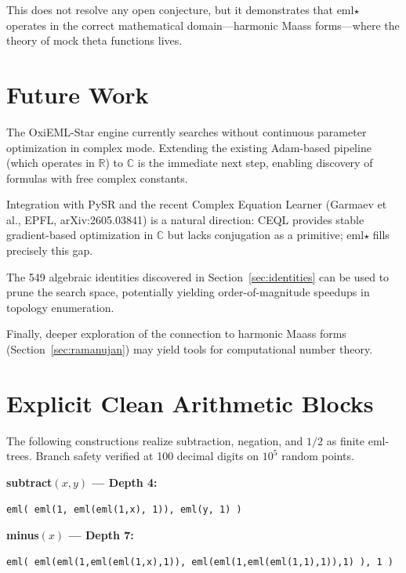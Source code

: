 \documentclass[11pt,a4paper]{article}
\begin{document}
This does not resolve any open conjecture, but it demonstrates that eml$\star$
operates in the correct mathematical domain---harmonic Maass forms---where
the theory of mock theta functions lives.


\section{Future Work}

The OxiEML-Star engine currently searches without continuous parameter
optimization in complex mode.  Extending the existing Adam-based pipeline
(which operates in $\mathbb{R}$) to $\mathbb{C}$ is the immediate next step,
enabling discovery of formulas with free complex constants.

Integration with PySR and the recent Complex Equation Learner
(Garmaev et al., EPFL, arXiv:2605.03841) is a natural direction:
CEQL provides stable gradient-based optimization in $\mathbb{C}$ but lacks
conjugation as a primitive; eml$\star$ fills precisely this gap.

The 549 algebraic identities discovered in Section~\ref{sec:identities}
can be used to prune the search space, potentially yielding order-of-magnitude
speedups in topology enumeration.

Finally, deeper exploration of the connection to harmonic Maass forms
(Section~\ref{sec:ramanujan}) may yield tools for computational number theory.

\appendix
\section{Explicit Clean Arithmetic Blocks}

The following constructions realize subtraction, negation, and $1/2$ as finite eml-trees. Branch safety verified at 100 decimal digits on $10^5$ random points.

\textbf{subtract$(x, y)$ --- Depth 4:}
\begin{verbatim}
eml( eml(1, eml(eml(1,x), 1)), eml(y, 1) )
\end{verbatim}

\textbf{minus$(x)$ --- Depth 7:}
\begin{verbatim}
eml( eml(eml(1,eml(eml(1,x),1)), eml(eml(1,eml(eml(1,1),1)),1) ), 1 )
\end{verbatim}
\end{document}
